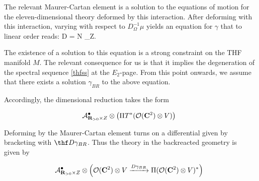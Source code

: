 The relevant Maurer-Cartan element is a solution to the equations of motion for the eleven-dimensional theory deformed by this interaction. After deforming with this interaction, varying with respect to $D_{\Omega}^{-1}\mu$ yields an equation for $\gamma$ that to linear order reads:
\beqn
\thfd D \gamma  = N \delta_Z.
\eeqn

The existence of a solution to this equation is a strong constraint on the THF manifold $M$. The relevant consequence for us is that it implies the degeneration of the spectral sequence \ref{thfss} at the $E_{2}$-page. From this point onwards, we assume that there exists a solution $\gamma_{BR}$ to the above equation.

Accordingly, the dimensional reduction takes the form

\[
\mathcal A^{\bullet}_{\mathbf{R}_{>0}\times Z} \otimes \left ( \Pi T^{*} (\mathcal O (\mathbf{C}^{2}) \otimes V) \right)
\]

Deforming by the Maurer-Cartan element turns on a differential given by bracketing with $\thf D\gamma_{BR}$. Thus the theory in the backreacted geometry is given by

\[
\mathcal A^{\bullet}_{\mathbf{R}_{>0}\times Z} \otimes \left ( \mathcal O (\mathbf{C}^{2})\otimes V \xrightarrow{D\gamma_{BR}} \Pi (\mathcal O (\mathbf{C}^{2})\otimes V)^{*} \right )
\]





